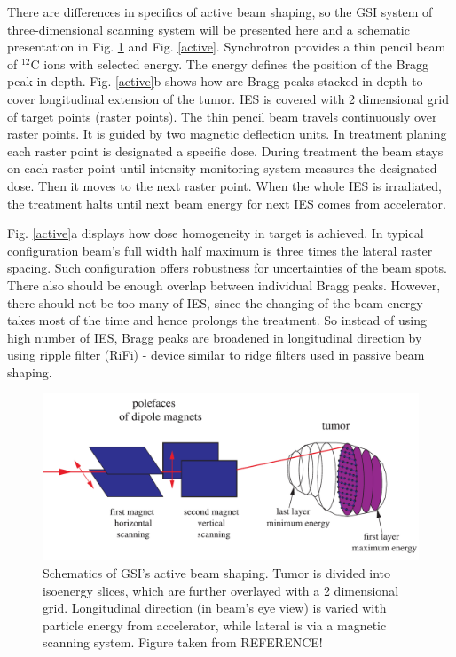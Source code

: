 \documentclass[type=dr, dr=rernat, accentcolor=tud7b,colorbacktitle, bigchapter, openright, twoside, 12pt ]{tudthesis}
\begin{document}
There are differences in specifics of active beam shaping, so the GSI system of three-dimensional scanning system will be presented here \cite{Haberer1993,Kraft2000,Schardt2010} and a schematic presentation in Fig. \ref{scanning} and Fig. \ref{active}.
Synchrotron provides a thin pencil beam of $^{12}$C ions with selected energy. The energy defines the position of the Bragg peak in depth. Fig. \ref{active}b shows how are Bragg peaks stacked in depth to cover longitudinal extension of the tumor.
IES is covered with 2 dimensional grid of target points (raster points). The thin pencil beam travels continuously over raster points. It is guided by two magnetic deflection units. In treatment planing each raster point is designated a specific dose. 
During treatment the beam stays on each raster point until intensity monitoring system measures the designated dose. Then it moves to the next raster point. When the whole IES is irradiated, the treatment halts until next beam energy for next IES comes
from accelerator.

Fig. \ref{active}a displays how dose homogeneity in target is achieved. In typical configuration beam's full width half maximum is three times the lateral raster spacing. Such configuration offers robustness for uncertainties of the beam spots.
There also should be enough overlap between individual Bragg peaks. However, there should not be too many of IES, since the changing of the beam energy takes most of the time and hence prolongs the treatment. So instead of using high number of
 IES, Bragg peaks are broadened in longitudinal direction by using ripple filter (RiFi) - device similar to ridge filters used in passive beam shaping. 



\newpage

\vspace*{0.6cm}

\begin{figure}[H]
\begin{center}
\includegraphics[scale=0.4]{./Images/therapy.png}
\caption{Schematics of GSI's active beam shaping. Tumor is divided into isoenergy slices, which are further overlayed with a 2 dimensional grid. 
Longitudinal direction (in beam's eye view) is varied with particle energy from accelerator, while lateral is via a magnetic scanning system. Figure taken from REFERENCE!}
\label{scanning}
\end{center}
\end{figure}
\end{document}
